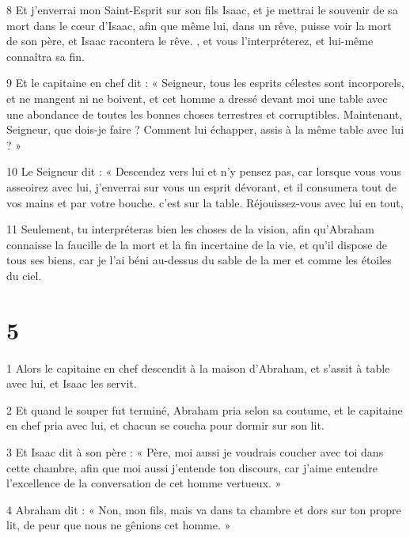 \par 8 Et j'enverrai mon Saint-Esprit sur son fils Isaac, et je mettrai le souvenir de sa mort dans le cœur d'Isaac, afin que même lui, dans un rêve, puisse voir la mort de son père, et Isaac racontera le rêve. , et vous l’interpréterez, et lui-même connaîtra sa fin.

\par 9 Et le capitaine en chef dit : « Seigneur, tous les esprits célestes sont incorporels, et ne mangent ni ne boivent, et cet homme a dressé devant moi une table avec une abondance de toutes les bonnes choses terrestres et corruptibles. Maintenant, Seigneur, que dois-je faire ? Comment lui échapper, assis à la même table avec lui ? »

\par 10 Le Seigneur dit : « Descendez vers lui et n'y pensez pas, car lorsque vous vous asseoirez avec lui, j'enverrai sur vous un esprit dévorant, et il consumera tout de vos mains et par votre bouche. c'est sur la table. Réjouissez-vous avec lui en tout,

\par 11 Seulement, tu interpréteras bien les choses de la vision, afin qu'Abraham connaisse la faucille de la mort et la fin incertaine de la vie, et qu'il dispose de tous ses biens, car je l'ai béni au-dessus du sable de la mer et comme les étoiles du ciel.

\chapter{5}

\par 1 Alors le capitaine en chef descendit à la maison d'Abraham, et s'assit à table avec lui, et Isaac les servit.

\par 2 Et quand le souper fut terminé, Abraham pria selon sa coutume, et le capitaine en chef pria avec lui, et chacun se coucha pour dormir sur son lit.

\par 3 Et Isaac dit à son père : « Père, moi aussi je voudrais coucher avec toi dans cette chambre, afin que moi aussi j'entende ton discours, car j'aime entendre l'excellence de la conversation de cet homme vertueux. »

\par 4 Abraham dit : « Non, mon fils, mais va dans ta chambre et dors sur ton propre lit, de peur que nous ne gênions cet homme. »


